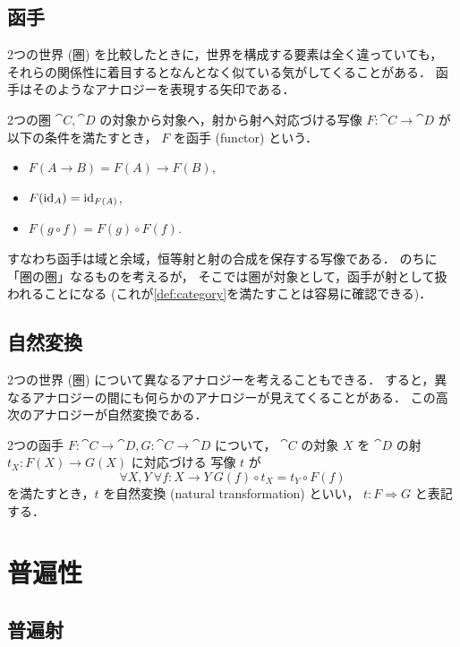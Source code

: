 \documentclass[titlepage]{ltjsreport}
\newtheorem[S]{theorem}{定理}[chapter]
\newtheorem[S]{definition}[theorem]{定義}
\newtheorem[S]{example}[theorem]{例}
\begin{document}
\section{函手}

2つの世界 (圏) を比較したときに，世界を構成する要素は全く違っていても，
それらの関係性に着目するとなんとなく似ている気がしてくることがある．
函手はそのようなアナロジーを表現する矢印である．
\begin{definition}[函手]
  2つの圏 $\cat{C},\cat{D}$ の対象から対象へ，射から射へ対応づける写像
  $F:\cat{C}\to\cat{D}$ が以下の条件を満たすとき，
  $F$ を函手 (functor) という．
  \begin{itemize}
    \item $F(A\to B)=F(A)\to F(B)$,
    \item $F(\mathrm{id}_{A})=\mathrm{id}_{F(A)}$,
    \item $F(g\circ f)=F(g)\circ F(f)$.
  \end{itemize}
\end{definition}
すなわち函手は域と余域，恒等射と射の合成を保存する写像である．
のちに「圏の圏」なるものを考えるが，
そこでは圏が対象として，函手が射として扱われることになる
(これが\cref{def:category}を満たすことは容易に確認できる)．

\section{自然変換}

2つの世界 (圏) について異なるアナロジーを考えることもできる．
すると，異なるアナロジーの間にも何らかのアナロジーが見えてくることがある．
この高次のアナロジーが自然変換である．

\begin{definition}[自然変換]
  2つの函手 $F:\cat{C}\to\cat{D},G:\cat{C}\to\cat{D}$ について，
  $\cat{C}$ の対象 $X$ を $\cat{D}$ の射 $t_X:F(X)\to G(X)$ に対応づける
  写像 $t$ が
  \begin{equation}
    \forall X,Y\ \forall f:X\to Y\ G(f)\circ t_X=t_Y\circ F(f)
  \end{equation}
  を満たすとき，$t$ を自然変換 (natural transformation) といい，
  $t:F\Rightarrow G$ と表記する．
\end{definition}

\chapter{普遍性}

\section{普遍射}
\end{document}
